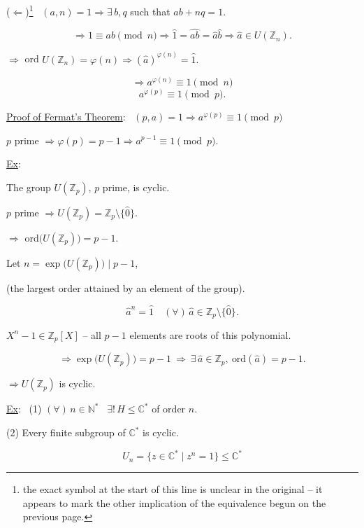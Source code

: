 \documentclass[12pt]{article}
\begin{document}
\noindent ($\Leftarrow$)\footnote{the exact symbol at the start of this line is unclear in the original -- it appears to mark the other implication of the equivalence begun on the previous page.} \ $(a,n)=1 \Rightarrow \exists\,b,q$ such that $ab+nq=1$.

\[
\Rightarrow 1\equiv ab \pmod n \Rightarrow \hat 1=\widehat{ab}=\hat a\hat b \Rightarrow \hat a\in U(\mathbb{Z}_n).
\]

\bigskip
\noindent $\Rightarrow$ ord $U(\mathbb{Z}_n) = \varphi(n) \Rightarrow (\hat a)^{\varphi(n)} = \hat 1.$

\[
\Rightarrow a^{\varphi(n)} \equiv 1 \pmod n
\]
\[
a^{\varphi(p)} \equiv 1 \pmod p.
\]

\bigskip
\noindent\underline{Proof of Fermat's Theorem}: \ $(p,a)=1 \Rightarrow a^{\varphi(p)}\equiv 1 \pmod p$

\noindent $p$ prime $\Rightarrow \varphi(p)=p-1 \Rightarrow a^{p-1}\equiv 1 \pmod p$.

\bigskip
\noindent\underline{Ex}:

\noindent The group $U(\mathbb{Z}_p)$, $p$ prime, is cyclic.

\bigskip
\noindent $p$ prime $\Rightarrow U(\mathbb{Z}_p) = \mathbb{Z}_p\setminus\{\hat 0\}$.

\noindent $\Rightarrow$ ord$\big(U(\mathbb{Z}_p)\big)=p-1$.

\bigskip
\noindent Let $n=\exp\big(U(\mathbb{Z}_p)\big) \mid p-1$,

\noindent \big(the largest order attained by an element of the group\big).

\[
\hat a^n = \hat 1 \quad (\forall)\,\hat a\in\mathbb{Z}_p\setminus\{\hat 0\}.
\]

\noindent $X^n-1\in\mathbb{Z}_p[X]$ -- all $p-1$ elements are roots of this polynomial.

\[
\Rightarrow \exp\big(U(\mathbb{Z}_p)\big) = p-1 \ \Rightarrow \ \exists\,\hat a\in\mathbb{Z}_p, \ \text{ord}(\hat a)=p-1.
\]

\noindent $\Rightarrow U(\mathbb{Z}_p)$ is cyclic.

\bigskip
\noindent\underline{Ex}: \ (1) $(\forall)\,n\in\mathbb{N}^*$ \ $\exists!\,H\leq\mathbb{C}^*$ of order $n$.

\noindent (2) Every finite subgroup of $\mathbb{C}^*$ is cyclic.

\[
U_n = \{z\in\mathbb{C}^* \mid z^n=1\} \leq \mathbb{C}^*
\]
\end{document}
